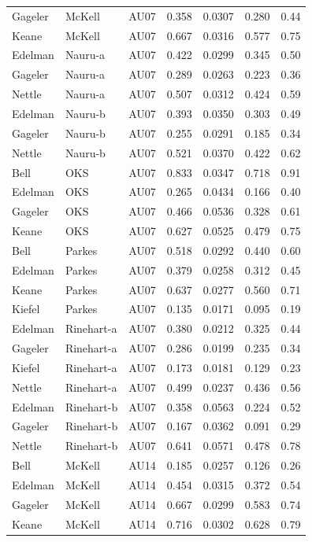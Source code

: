 \documentclass{monashthesis}
\begin{document}
\begin{center}
\begin{longtable}{lllllll}
Gageler & McKell & AU07 & 0.358 & 0.0307 & 0.280 & 0.44 \\
Keane & McKell & AU07 & 0.667 & 0.0316 & 0.577 & 0.75 \\
Edelman & Nauru-a & AU07 & 0.422 & 0.0299 & 0.345 & 0.50 \\
Gageler & Nauru-a & AU07 & 0.289 & 0.0263 & 0.223 & 0.36 \\
Nettle & Nauru-a & AU07 & 0.507 & 0.0312 & 0.424 & 0.59 \\
Edelman & Nauru-b & AU07 & 0.393 & 0.0350 & 0.303 & 0.49 \\
Gageler & Nauru-b & AU07 & 0.255 & 0.0291 & 0.185 & 0.34 \\
Nettle & Nauru-b & AU07 & 0.521 & 0.0370 & 0.422 & 0.62 \\
Bell & OKS & AU07 & 0.833 & 0.0347 & 0.718 & 0.91 \\
Edelman & OKS & AU07 & 0.265 & 0.0434 & 0.166 & 0.40 \\
Gageler & OKS & AU07 & 0.466 & 0.0536 & 0.328 & 0.61 \\
Keane & OKS & AU07 & 0.627 & 0.0525 & 0.479 & 0.75 \\
Bell & Parkes & AU07 & 0.518 & 0.0292 & 0.440 & 0.60 \\
Edelman & Parkes & AU07 & 0.379 & 0.0258 & 0.312 & 0.45 \\
Keane & Parkes & AU07 & 0.637 & 0.0277 & 0.560 & 0.71 \\
Kiefel & Parkes & AU07 & 0.135 & 0.0171 & 0.095 & 0.19 \\
Edelman & Rinehart-a & AU07 & 0.380 & 0.0212 & 0.325 & 0.44 \\
Gageler & Rinehart-a & AU07 & 0.286 & 0.0199 & 0.235 & 0.34 \\
Kiefel & Rinehart-a & AU07 & 0.173 & 0.0181 & 0.129 & 0.23 \\
Nettle & Rinehart-a & AU07 & 0.499 & 0.0237 & 0.436 & 0.56 \\
Edelman & Rinehart-b & AU07 & 0.358 & 0.0563 & 0.224 & 0.52 \\
Gageler & Rinehart-b & AU07 & 0.167 & 0.0362 & 0.091 & 0.29 \\
Nettle & Rinehart-b & AU07 & 0.641 & 0.0571 & 0.478 & 0.78 \\
Bell & McKell & AU14 & 0.185 & 0.0257 & 0.126 & 0.26 \\
Edelman & McKell & AU14 & 0.454 & 0.0315 & 0.372 & 0.54 \\
Gageler & McKell & AU14 & 0.667 & 0.0299 & 0.583 & 0.74 \\
Keane & McKell & AU14 & 0.716 & 0.0302 & 0.628 & 0.79 \\

\end{longtable}
\end{center}
\end{document}
